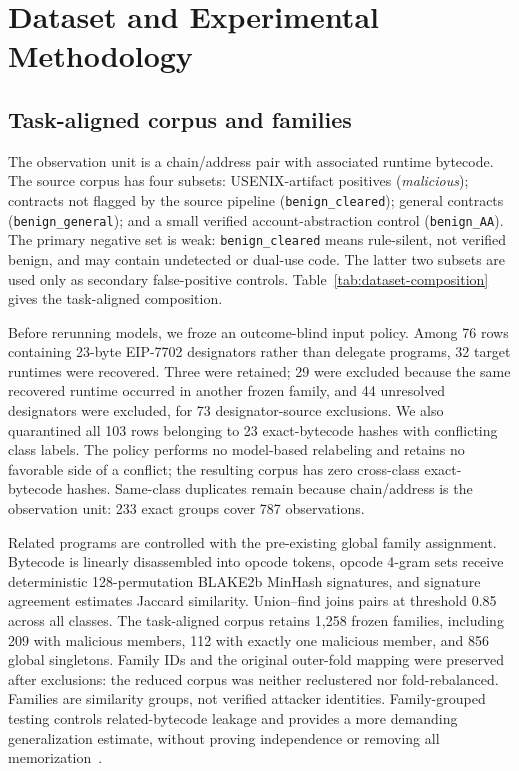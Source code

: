 \section{Dataset and Experimental Methodology}
\label{sec:methodology}

\subsection{Task-aligned corpus and families}

The observation unit is a chain/address pair with associated runtime bytecode. The source corpus has four subsets: USENIX-artifact positives (\emph{malicious}); contracts not flagged by the source pipeline (\texttt{benign\_cleared}); general contracts (\texttt{benign\_general}); and a small verified account-abstraction control (\texttt{benign\_AA}). The primary negative set is weak: \texttt{benign\_cleared} means rule-silent, not verified benign, and may contain undetected or dual-use code. The latter two subsets are used only as secondary false-positive controls. Table~\ref{tab:dataset-composition} gives the task-aligned composition.



Before rerunning models, we froze an outcome-blind input policy. Among 76 rows containing 23-byte EIP-7702 designators rather than delegate programs, 32 target runtimes were recovered. Three were retained; 29 were excluded because the same recovered runtime occurred in another frozen family, and 44 unresolved designators were excluded, for 73 designator-source exclusions. We also quarantined all 103 rows belonging to 23 exact-bytecode hashes with conflicting class labels. The policy performs no model-based relabeling and retains no favorable side of a conflict; the resulting corpus has zero cross-class exact-bytecode hashes. Same-class duplicates remain because chain/address is the observation unit: 233 exact groups cover 787 observations.

Related programs are controlled with the pre-existing global family assignment. Bytecode is linearly disassembled into opcode tokens, opcode 4-gram sets receive deterministic 128-permutation BLAKE2b MinHash signatures, and signature agreement estimates Jaccard similarity. Union--find joins pairs at threshold 0.85 across all classes. The task-aligned corpus retains 1,258 frozen families, including 209 with malicious members, 112 with exactly one malicious member, and 856 global singletons. Family IDs and the original outer-fold mapping were preserved after exclusions: the reduced corpus was neither reclustered nor fold-rebalanced. Families are similarity groups, not verified attacker identities. Family-grouped testing controls related-bytecode leakage and provides a more demanding generalization estimate, without proving independence or removing all memorization~\cite{pendlebury2019tesseract}.

